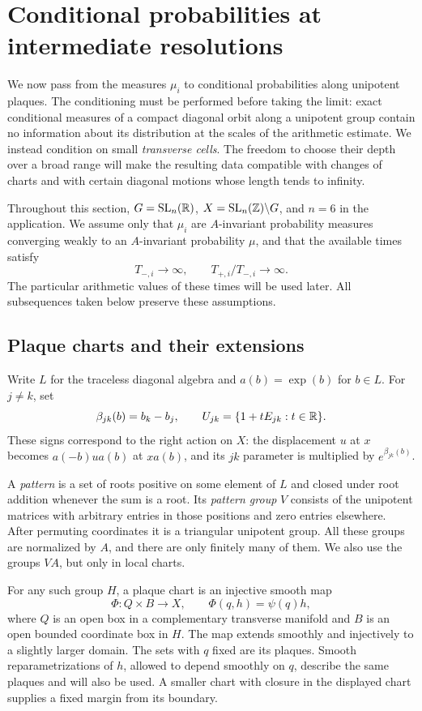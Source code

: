 \section{Conditional probabilities at intermediate resolutions}
\label{sec:conditioning}

We now pass from the measures $\mu_i$ to conditional probabilities along
unipotent plaques. The conditioning must be performed before taking the
limit: exact conditional measures of a compact diagonal orbit along a
unipotent group contain no information about its distribution at the
scales of the arithmetic estimate. We instead condition on small
\emph{transverse cells}. The freedom to choose their depth over a broad
range will make the resulting data compatible with changes of charts and
with certain diagonal motions whose length tends to infinity.

Throughout this section, $G=\operatorname{SL}_n(\mathbb R)$, $X=\operatorname{SL}_n(\mathbb Z)\backslash G$, and
$n=6$ in the application. We assume only that $\mu_i$ are $A$-invariant
probability measures converging weakly to an $A$-invariant probability
$\mu$, and that the available times satisfy
\[
 T_{-,i}\longrightarrow\infty,
 \qquad T_{+,i}/T_{-,i}\longrightarrow\infty.
\]
The particular arithmetic values of these times will be used later.
All subsequences taken below preserve these assumptions.

\subsection{Plaque charts and their extensions}

Write $L$ for the traceless diagonal algebra and $a(b)=\exp(b)$ for
$b\in L$. For $j\ne k$, set
\[
 \beta_{jk}(b)=b_k-b_j,
 \qquad U_{jk}=\{1+tE_{jk}:t\in\mathbb R\}.
\]
These signs correspond to the right action on $X$: the displacement $u$
at $x$ becomes $a(-b)ua(b)$ at $xa(b)$, and its $jk$ parameter is
multiplied by $e^{\beta_{jk}(b)}$.

A \emph{pattern} is a set of roots positive on some element of $L$ and
closed under root addition whenever the sum is a root. Its
\emph{pattern group} $V$ consists of the unipotent matrices with arbitrary
entries in those positions and zero entries elsewhere. After permuting
coordinates it is a triangular unipotent group. All these groups are
normalized by $A$, and there are only finitely many of them. We also use
the groups $VA$, but only in local charts.

For any such group $H$, a plaque chart is an injective smooth map
\begin{equation}
 \Phi:Q\times B\longrightarrow X,
 \qquad \Phi(q,h)=\psi(q)h,
 \label{eq:plaque-chart}
\end{equation}
where $Q$ is an open box in a complementary transverse manifold and
$B$ is an open bounded coordinate box in $H$. The map extends smoothly
and injectively to a slightly larger domain. The sets with $q$ fixed
are its plaques. Smooth reparametrizations of $h$, allowed to depend
smoothly on $q$, describe the same plaques and will also be used. A
smaller chart with closure in the displayed chart supplies a fixed
margin from its boundary.

